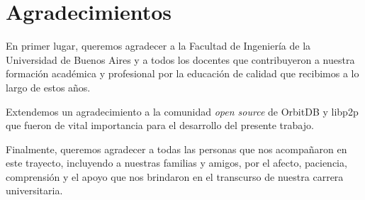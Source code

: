 \newpage
\section{Agradecimientos}

En primer lugar, queremos agradecer a la Facultad de Ingeniería de la Universidad de Buenos Aires y a todos los docentes que contribuyeron a nuestra formación académica y profesional por la educación de calidad que recibimos a lo largo de estos años.

Extendemos un agradecimiento a la comunidad \textit{open source} de OrbitDB y libp2p que fueron de vital importancia para el desarrollo del presente trabajo.

Finalmente, queremos agradecer a todas las personas que nos acompañaron en este trayecto, incluyendo a nuestras familias y amigos, por el afecto, paciencia, comprensión y el apoyo que nos brindaron en el transcurso de nuestra carrera universitaria.

\newpage